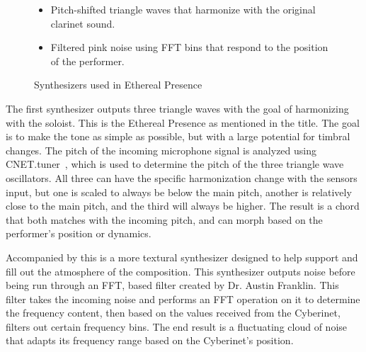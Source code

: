 \begin{figure}
    \centering
\begin{itemize}
    \item Pitch-shifted triangle waves that harmonize with the original clarinet sound.
    \item Filtered pink noise using FFT bins that respond to the position of the performer.
\end{itemize}
    \caption{Synthesizers used in Ethereal Presence}
    \label{fig:etherealSynths}
\end{figure}



The first synthesizer outputs three triangle waves with the goal of harmonizing with the soloist. This is the Ethereal Presence as mentioned in the title. The goal is to make the tone as simple as possible, but with a large potential for timbral changes. The pitch of the incoming microphone signal is analyzed using CNET.tuner~, which is used to determine the pitch of the three triangle wave oscillators. All three can have the specific harmonization change with the sensors input, but one is scaled to always be below the main pitch, another is relatively close to the main pitch, and the third will always be higher. The result is a chord that both matches with the incoming pitch, and can morph based on the performer's position or dynamics. 


Accompanied by this is a more textural synthesizer designed to help support and fill out the atmosphere of the composition. This synthesizer outputs noise before being run through an FFT, based filter created by Dr. Austin Franklin. This filter takes the incoming noise and performs an FFT operation on it to determine the frequency content, then based on the values received from the Cyberinet, filters out certain frequency bins. The end result is a fluctuating cloud of noise that adapts its frequency range based on the Cyberinet's position.


